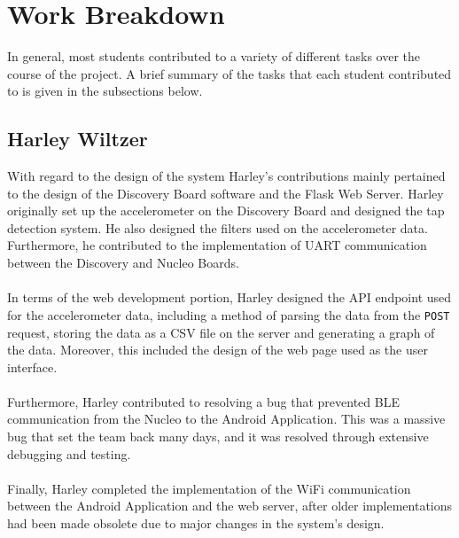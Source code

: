 \section*{Work Breakdown}
In general, most students contributed to a variety of different tasks over the course of the
project. A brief summary of the tasks that each student contributed to is given in the subsections
below.

\subsection*{Harley Wiltzer}
With regard to the design of the system Harley's contributions mainly pertained to the design of the
Discovery Board software and the Flask Web Server. Harley originally set up the accelerometer on the
Discovery Board and designed the tap detection system. He also designed the filters used on the
accelerometer data. Furthermore, he contributed to the
implementation of UART communication between the Discovery and Nucleo Boards.\\\\
In terms of the web development portion, Harley designed the API endpoint used for the accelerometer
data, including a method of parsing the data from the \texttt{POST} request, storing the data as a
CSV file on the server and generating a graph of the data. Moreover, this included the design of the
web page used as the user interface.\\\\
Furthermore, Harley contributed to resolving a bug that prevented BLE communication from the Nucleo
to the Android Application. This was a massive bug that set the team back many days, and it was
resolved through extensive debugging and testing.\\\\
Finally, Harley completed the implementation of the WiFi communication between the Android
Application and the web server, after older implementations had been made obsolete due to major
changes in the system's design.

